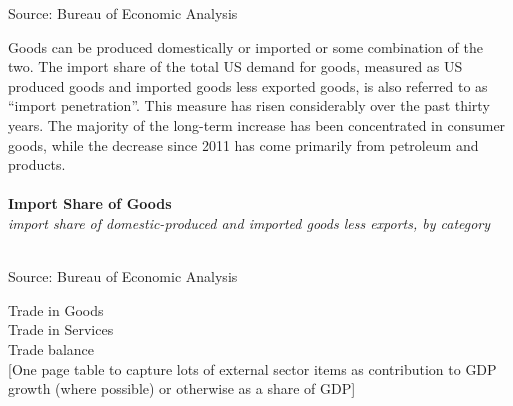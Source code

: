 \documentclass{report}
\makeatletter
\newcommand{\tbllink}[1]{\href{https://raw.githubusercontent.com/bdecon/US-chartbook/master/chartbook/data/#1}{\faTable}}
\newcommand*\short[1]{\expandafter\@gobbletwo\number\numexpr#1\relax}
\newcommand{\sbar}[4]{
		\addplot[ybar stacked, bar width=2.7pt, draw opacity=0, fill=#1] 
			table [x=#2, y=#3, col sep=comma]{#4};}
\newcommand{\dateaxisticks}{
		date coordinates in=x, axis line style={draw=none},
		xmax={2020-02-01},
		max space between ticks=40,	    
		xtick={{1990-01-01}, {1992-01-01}, {1994-01-01}, 
			{1996-01-01}, {1998-01-01}, {2000-01-01}, 
			{2002-01-01}, {2004-01-01}, {2006-01-01},
			{2008-01-01}, {2010-01-01}, {2012-01-01}, {2014-01-01},
		    {2016-01-01}, {2018-01-01}, {2020-01-01}},
		minor xtick={{1989-01-01}, {1991-01-01}, {1993-01-01},
			{1995-01-01}, {1997-01-01}, {1999-01-01}, 
			{2001-01-01}, {2003-01-01}, {2005-01-01}, {2007-01-01},
		    {2009-01-01}, {2011-01-01}, {2013-01-01}, {2015-01-01},
		    {2017-01-01}, {2019-01-01}},
		enlarge y limits={0.06}, enlarge x limits={0.01},
		}
\newcommand{\bbar}[2]{extra #1 ticks = {{#2}}, extra #1 tick labels = ,
		extra #1 tick style = {grid=major, grid style={thick, black!25}},}
\newcommand{\rbars}{
		\fill[color=black!10] (axis cs:{1990-07-01},\pgfkeysvalueof{/pgfplots/ymin}) rectangle 
			(axis cs:{1991-03-01}, \pgfkeysvalueof{/pgfplots/ymax});
		\fill[color=black!10] (axis cs:{2007-12-01},\pgfkeysvalueof{/pgfplots/ymin}) rectangle 
			(axis cs:{2009-07-01}, \pgfkeysvalueof{/pgfplots/ymax});
		\fill[color=black!10] (axis cs:{2001-03-01},\pgfkeysvalueof{/pgfplots/ymin}) rectangle 
			(axis cs:{2001-11-01}, \pgfkeysvalueof{/pgfplots/ymax});}
\makeatother
\begin{document}
{{{{{\vspace{-2mm}
\footnotesize{Source: Bureau of Economic Analysis}}



\newpage


\begin{minipage}{0.76\textwidth}

\small Goods can be produced domestically or imported or some combination of the two. The import share of the total US demand for goods, measured as US produced goods and imported goods less exported goods, is also referred to as ``import penetration''. This measure has risen considerably over the past thirty years. The majority of the long-term increase has been concentrated in consumer goods, while the decrease since 2011 has come primarily from petroleum and products. \\

 \\

\noindent \normalsize \textbf{Import Share of Goods}\\
\footnotesize{\textit{import share of domestic-produced and imported goods less exports, by category}}\\
\noindent \hspace*{-2mm} \\
\footnotesize{Source: Bureau of Economic Analysis} \hfill \tbllink{goodsimpsh.csv}\\


\vspace{5mm}

\normalsize 

Trade in Goods \\

Trade in Services \\

Trade balance \\

[One page table to capture lots of external sector items as contribution to GDP growth (where possible) or otherwise as a share of GDP]\\


\end{minipage}}}}}
\end{document}

